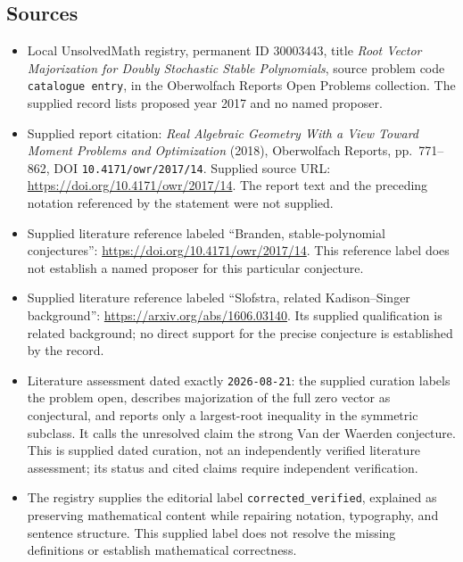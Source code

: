 \documentclass[11pt]{article}
\begin{document}
\subsection{Sources}
\begin{itemize}
\item Local UnsolvedMath registry, permanent ID \(30003443\), title \emph{Root Vector Majorization for Doubly Stochastic Stable Polynomials}, source problem code \texttt{catalogue entry}, in the Oberwolfach Reports Open Problems collection. The supplied record lists proposed year 2017 and no named proposer.
\item Supplied report citation: \emph{Real Algebraic Geometry With a View Toward Moment Problems and Optimization} (2018), Oberwolfach Reports, pp.~771--862, DOI \texttt{10.4171/owr/2017/14}. Supplied source URL: \url{https://doi.org/10.4171/owr/2017/14}. The report text and the preceding notation referenced by the statement were not supplied.
\item Supplied literature reference labeled ``Branden, stable-polynomial conjectures'': \url{https://doi.org/10.4171/owr/2017/14}. This reference label does not establish a named proposer for this particular conjecture.
\item Supplied literature reference labeled ``Slofstra, related Kadison--Singer background'': \url{https://arxiv.org/abs/1606.03140}. Its supplied qualification is related background; no direct support for the precise conjecture is established by the record.
\item Literature assessment dated exactly \texttt{2026-08-21}: the supplied curation labels the problem open, describes majorization of the full zero vector as conjectural, and reports only a largest-root inequality in the symmetric subclass. It calls the unresolved claim the strong Van der Waerden conjecture. This is supplied dated curation, not an independently verified literature assessment; its status and cited claims require independent verification.
\item The registry supplies the editorial label \texttt{corrected\_verified}, explained as preserving mathematical content while repairing notation, typography, and sentence structure. This supplied label does not resolve the missing definitions or establish mathematical correctness.
\end{itemize}
\end{document}
